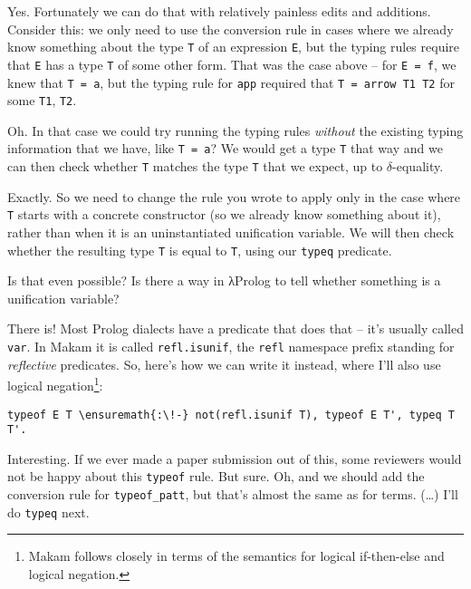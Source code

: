 \heroADVISOR{} Yes. Fortunately we can do that with relatively painless edits
and additions. Consider this: we only need to use the conversion rule in
cases where we already know something about the type \texttt{T} of an
expression \texttt{E}, but the typing rules require that \texttt{E} has
a type \texttt{T\textquotesingle{}} of some other form. That was the
case above -- for \texttt{E\ =\ f}, we knew that \texttt{T\ =\ a}, but
the typing rule for \texttt{app} required that
\texttt{T\textquotesingle{}\ =\ arrow\ T1\ T2} for some \texttt{T1},
\texttt{T2}.

\heroSTUDENT{} Oh. In that case we could try running the typing rules
\emph{without} the existing typing information that we have, like
\texttt{T\ =\ a}? We would get a type \texttt{T\textquotesingle{}} that
way and we can then check whether \texttt{T\textquotesingle{}} matches
the type \texttt{T} that we expect, up to \(\delta\)-equality.

\heroADVISOR{} Exactly. So we need to change the rule you wrote to apply only
in the case where \texttt{T} starts with a concrete constructor (so we
already know something about it), rather than when it is an
uninstantiated unification variable. We will then check whether the
resulting type \texttt{T\textquotesingle{}} is equal to \texttt{T},
using our \texttt{typeq} predicate.

\heroSTUDENT{} Is that even possible? Is there a way in \foreignlanguage{greek}{λ}Prolog to tell
whether something is a unification variable?

\heroADVISOR{} There is! Most Prolog dialects have a predicate that does that
-- it's usually called \texttt{var}. In Makam it is called
\texttt{refl.isunif}, the \texttt{refl} namespace prefix standing for
\emph{reflective} predicates. So, here's how we can write it instead,
where I'll also use logical
negation\footnote{Makam follows \citet{kiselyov05backtracking} closely in terms of the semantics for logical if-then-else and logical negation.}:

\importantCodeblock{}

\begin{verbatim}
typeof E T \ensuremath{:\!-} not(refl.isunif T), typeof E T', typeq T T'.
\end{verbatim}

\importantCodeblockEnd{}

\heroSTUDENT{} Interesting. If we ever made a paper submission out of this,
some reviewers would not be happy about this \texttt{typeof} rule. But
sure. Oh, and we should add the conversion rule for
\texttt{typeof\_patt}, but that's almost the same as for terms.
(\ldots{}) I'll do \texttt{typeq} next.

